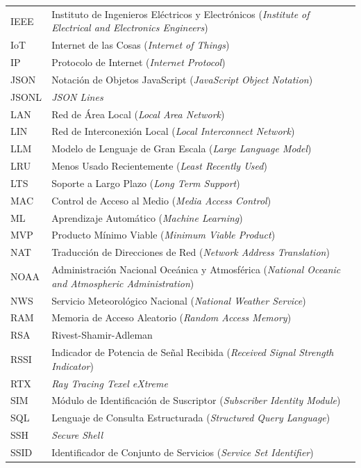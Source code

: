 \begin{longtable}{|l|p{10cm}|}
IEEE & Instituto de Ingenieros Eléctricos y Electrónicos (\textit{Institute of Electrical and Electronics Engineers}) \\
IoT & Internet de las Cosas (\textit{Internet of Things}) \\
IP & Protocolo de Internet (\textit{Internet Protocol}) \\
JSON & Notación de Objetos JavaScript (\textit{JavaScript Object Notation}) \\
JSONL & \textit{JSON Lines} \\
LAN & Red de Área Local (\textit{Local Area Network}) \\
LIN & Red de Interconexión Local (\textit{Local Interconnect Network}) \\
LLM & Modelo de Lenguaje de Gran Escala (\textit{Large Language Model}) \\
LRU & Menos Usado Recientemente (\textit{Least Recently Used}) \\
LTS & Soporte a Largo Plazo (\textit{Long Term Support}) \\
MAC & Control de Acceso al Medio (\textit{Media Access Control}) \\
ML & Aprendizaje Automático (\textit{Machine Learning}) \\
MVP & Producto Mínimo Viable (\textit{Minimum Viable Product}) \\
NAT & Traducción de Direcciones de Red (\textit{Network Address Translation}) \\
NOAA & Administración Nacional Oceánica y Atmosférica (\textit{National Oceanic and Atmospheric Administration}) \\
NWS & Servicio Meteorológico Nacional (\textit{National Weather Service}) \\
RAM & Memoria de Acceso Aleatorio (\textit{Random Access Memory}) \\
RSA & Rivest-Shamir-Adleman \\
RSSI & Indicador de Potencia de Señal Recibida (\textit{Received Signal Strength Indicator}) \\
RTX & \textit{Ray Tracing Texel eXtreme} \\
SIM & Módulo de Identificación de Suscriptor (\textit{Subscriber Identity Module}) \\
SQL & Lenguaje de Consulta Estructurada (\textit{Structured Query Language}) \\
SSH & \textit{Secure Shell} \\
SSID & Identificador de Conjunto de Servicios (\textit{Service Set Identifier}) \\

\end{longtable}
